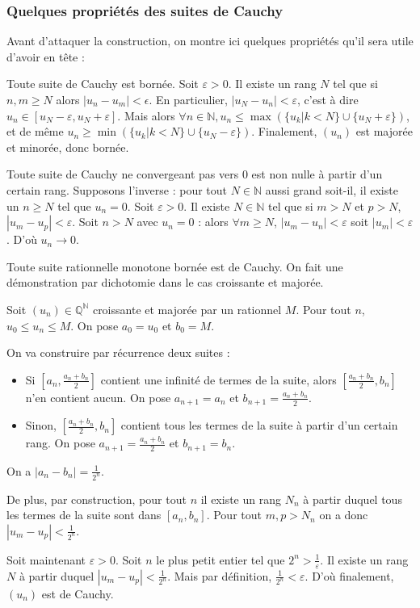 \subsubsection{Quelques propriétés des suites de Cauchy}

Avant d'attaquer la construction, on montre ici quelques propriétés qu'il sera utile d'avoir en tête :

\begin{prop}
Toute suite de Cauchy est bornée.
\tcblower
Soit $\varepsilon>0$. Il existe un rang $N$ tel que si $n,m \geq N$ alors $|u_n-u_m|<\epsilon$. En particulier, $|u_N-u_n|<\varepsilon$, c'est à dire $u_n \in [u_N - \varepsilon, u_N + \varepsilon]$. Mais alors $\forall n \in \mathbb{N}, u_n \leq \max (\{ u_k | k < N\} \cup \{u_N+\varepsilon\})$, et de même $u_n \geq \min (\{ u_k | k < N\} \cup \{u_N-\varepsilon\})$. Finalement, $(u_n)$ est majorée et minorée, donc bornée.
\end{prop}

\begin{prop}
    Toute suite de Cauchy ne convergeant pas vers 0 est non nulle à partir d'un certain rang.
    \tcblower
    Supposons l'inverse : pour tout $N \in \mathbb{N}$ aussi grand soit-il, il existe un $n\geq N$ tel que $u_n=0$. Soit $\varepsilon >0$. Il existe $N \in \mathbb{N}$ tel que si $m>N$ et $p>N$, $|u_m-u_p|<\varepsilon$. Soit $n>N$ avec $u_n=0$ : alors $\forall m \geq N$, $|u_m-u_n|<\varepsilon$ soit $|u_m|<\varepsilon$. D'où $u_n \to 0$. 
\end{prop}

\begin{theoreme}
Toute suite rationnelle monotone bornée est de Cauchy.
\tcblower
On fait une démonstration par dichotomie dans le cas croissante et majorée.

Soit $(u_n) \in \mathbb{Q}^{\mathbb{N}}$ croissante et majorée par un rationnel $M$. Pour tout $n$, $u_0\leq u_n \leq M$. On pose $a_0=u_0$ et $b_0=M$.

On va construire par récurrence deux suites :
\begin{itemize}
    \item Si $[a_n, \frac{a_n+b_n}{2}]$ contient une infinité de termes de la suite, alors $[\frac{a_n+b_n}{2}, b_n]$ n'en contient aucun. On pose $a_{n+1}=a_n$ et $b_{n+1}=\frac{a_n+b_n}{2}$.
    \item Sinon, $[\frac{a_n+b_n}{2}, b_n]$ contient tous les termes de la suite à partir d'un certain rang. On pose $a_{n+1}=\frac{a_n+b_n}{2}$ et $b_{n+1}=b_n$.
\end{itemize}

On a $|a_n-b_n| = \frac{1}{2^n}$.

De plus, par construction, pour tout $n$ il existe un rang $N_n$ à partir duquel tous les termes de la suite sont dans $[a_n, b_n]$. Pour tout $m,p > N_n$ on a donc $|u_m-u_p|<\frac{1}{2^n}$.

Soit maintenant $\varepsilon > 0$. Soit $n$ le plus petit entier tel que $2^n>\frac{1}{\varepsilon}$. Il existe un rang $N$ à partir duquel $|u_m-u_p|<\frac{1}{2^n}$. Mais par définition, $\frac{1}{2^n}<\varepsilon$. D'où finalement, $(u_n)$ est de Cauchy.
\end{theoreme}

